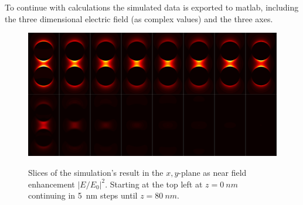 To continue with calculations the simulated data is exported to matlab, including the three dimensional electric field (as complex values) and the three axes.

\begin{figure}[!h]
  \includegraphics[width=\textwidth]{./images/simulation-slices.png}
  \label{slices}
  \caption{Slices of the simulation's result in the $x,y$-plane as near field enhancement $|E/E_0|^2$. Starting at the top left at $z=\SI{0}{nm}$ continuing in \SI{5}{nm} steps until $z=\SI{80}{nm}$.}
\end{figure}
